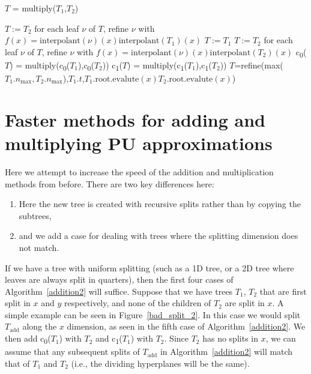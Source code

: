 \documentclass{article}
\newcommand{\nmax}{n_{\text{max}}}
\newcommand{\child}[1]{c\textsubscript{#1}}
\begin{document}
\begin{algorithm}[!h]
\caption{$T$ = multiply($T_1$,$T_2$)}
\label{multiply}
\begin{algorithmic}
\STATE $T:=T_2$
\STATE for each leaf $\nu$ of $T$, refine $\nu$ with $f(x)=\text{interpolant}(\nu)(x)\text{interpolant}(T_1)(x)$
\STATE $T:=T_1$
\STATE $T:=T_2$
\STATE for each leaf $\nu$ of $T$, refine $\nu$ with $f(x)=\text{interpolant}(\nu)(x)\text{interpolant}(T_2)(x)$
\STATE \child{0}($T$) = multiply(\child{0}($T_1$),\child{0}($T_2$))
\STATE \child{1}($T$) = multiply(\child{1}($T_1$),\child{1}($T_2$))
\ELSE
\STATE $T$=refine(max($T_1.\nmax,T_2.\nmax$),$T_1.t$,$T_1.\text{root.evalute}(x)T_2.\text{root.evalute}(x)$)
\ENDIF
\end{algorithmic}
\end{algorithm}

\section{Faster methods for adding and multiplying PU approximations}

Here we attempt to increase the speed of the addition and multiplication methods from before. There are two key differences here:
\begin{enumerate}
\item Here the new tree is created with recursive splits rather than by copying the subtrees,
\item and we add a case for dealing with trees where the splitting dimension does not match.	
\end{enumerate}
If we have a tree with uniform splitting (such as a 1D tree, or a 2D tree where leaves are always split in quarters), then the first four cases of Algorithm~\ref{addition2} will suffice. Suppose that we have trees $T_1$, $T_2$ that are first split in $x$ and $y$ respectively, and none of the children of $T_2$ are split in $x$. A simple example can be seen in Figure~\ref{bad_split_2}. In this case we would split $T_{\mbox{add}}$ along the $x$ dimension, as seen in the fifth case of Algorithm~\ref{addition2}. We then add \child{0}($T_1$) with $T_2$ and \child{1}($T_1$) with $T_2$. Since $T_2$ has no splits in $x$, we can assume that any subsequent splits of $T_{\mbox{add}}$ in Algorithm~\ref{addition2} will match that of $T_1$ and $T_2$ (i.e., the dividing hyperplanes will be the same). 
\end{document}
